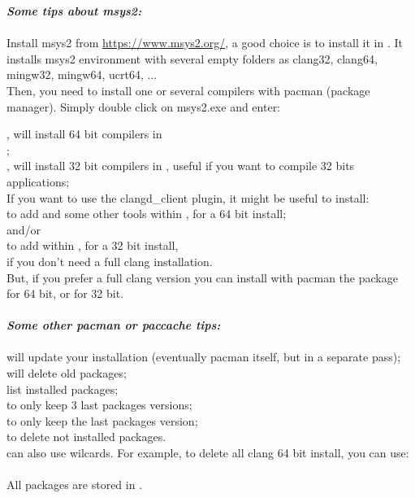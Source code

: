 \newpage
\begin{samepage}
\textbf{\textit{Some tips about msys2: }}\\
\\
Install msys2 from \url{https://www.msys2.org/}, a good choice is to install it in . It installs msys2 environment with several empty folders as clang32, clang64, mingw32, mingw64, ucrt64, ...\\
Then, you need to install one or several compilers with pacman (package manager). Simply double click on msys2.exe and enter:\\
\end{samepage}
, will install 64 bit compilers in \\
 ; \\
, will install 32 bit compilers in , useful if you want to compile 32 bits applications;\\
If you want to use the clangd\_client plugin, it might be useful to install:\\
 to add  and some other tools within , for a 64 bit install;\\
and/or \\
 to add  within , for a 32 bit install,\\
if you don't need a full clang installation.\\
But, if you prefer a full clang version you can install with pacman the package \\
 for 64 bit, or  for 32 bit.\\
\\
\textbf{\textit{Some other pacman or paccache tips:}}\\
\\
 will update your installation (eventually pacman itself, but in a separate pass);\\
 will delete old packages;\\
 list installed packages;\\
 to only keep 3 last packages versions;\\
 to only keep the last packages version;\\
 to delete not installed packages.\\
 can also use wilcards. For example, to delete all clang 64 bit install, you can use:\\
\\
All packages are stored in .


